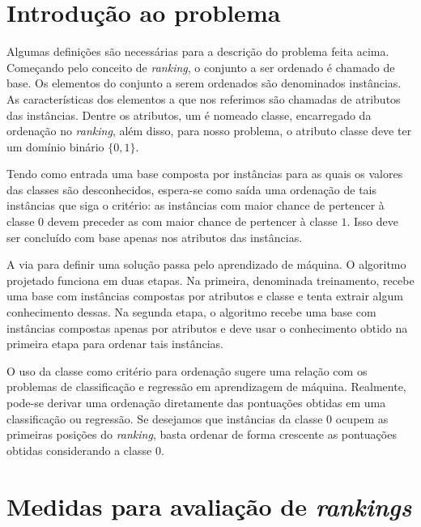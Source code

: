 
\section{Introdução ao problema}
Algumas definições são necessárias para a descrição do problema feita acima.
Começando pelo conceito de \emph{ranking}, o conjunto a ser ordenado é chamado
de base. Os elementos do conjunto a serem ordenados são denominados instâncias.
As características dos elementos a que nos referimos são chamadas de atributos
das instâncias. Dentre os atributos, um é nomeado classe, encarregado da
ordenação no \emph{ranking}, além disso, para nosso problema, o atributo classe
deve ter um domínio binário $\{0, 1\}$.

Tendo como entrada uma base composta por instâncias para as quais os valores
das classes são desconhecidos, espera-se como saída uma ordenação de tais
instâncias que siga o critério: as instâncias com maior chance de pertencer à
classe $0$ devem preceder as com maior chance de pertencer à classe $1$. Isso
deve ser concluído com base apenas nos atributos das instâncias.

A via para definir uma solução passa pelo aprendizado de máquina. O algoritmo
projetado funciona em duas etapas. Na primeira, denominada treinamento, recebe
uma base com instâncias compostas por atributos e classe e tenta extrair algum
conhecimento dessas. Na segunda etapa, o algoritmo recebe uma base com
instâncias compostas apenas por atributos e deve usar o conhecimento obtido na
primeira etapa para ordenar tais instâncias.

O uso da classe como critério para ordenação sugere uma relação com os problemas
de classificação e regressão em aprendizagem de máquina. Realmente, pode-se
derivar uma ordenação diretamente das pontuações obtidas em uma classificação ou
regressão. Se desejamos que instâncias da classe $0$ ocupem as primeiras
posições do \emph{ranking}, basta ordenar de forma crescente as pontuações
obtidas considerando a classe $0$.

\section{Medidas para avaliação de \emph{rankings}}

